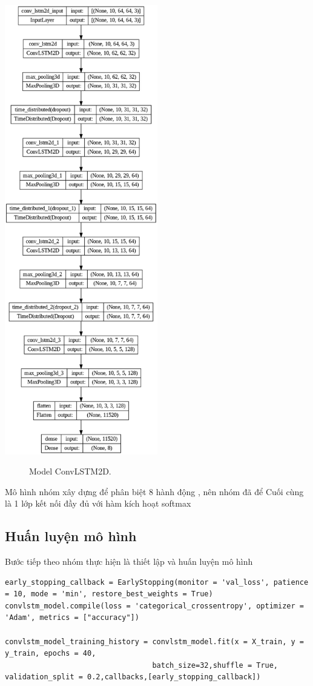 \includegraphics[width=0.5\textwidth]{Figures/model_conv.png}
\begin{figure}[ht!]
	\centering
	
	\caption[Model ConvLSTM2D.]{Model ConvLSTM2D.}
	\label{model_conv.png} 
    \end{figure}


Mô hình nhóm xây dựng để phân biệt 8 hành động , nên nhóm đã để Cuối cùng là 1 lớp kết nối đầy đủ với hàm kích hoạt softmax 
\subsection{Huấn luyện mô hình}
Bước tiếp theo nhóm thực hiện là thiết lập và huấn luyện mô hình 
\begin{lstlisting}[style=codePython]
early_stopping_callback = EarlyStopping(monitor = 'val_loss', patience = 10, mode = 'min', restore_best_weights = True)
convlstm_model.compile(loss = 'categorical_crossentropy', optimizer = 'Adam', metrics = ["accuracy"])

convlstm_model_training_history = convlstm_model.fit(x = X_train, y = y_train, epochs = 40,             
                                  batch_size=32,shuffle = True, validation_split = 0.2,callbacks,[early_stopping_callback])
\end{lstlisting}

